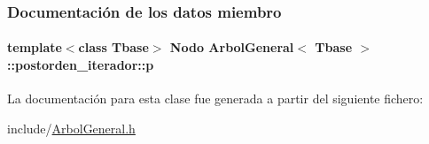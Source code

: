 \subsubsection{Documentación de los datos miembro}
\hypertarget{classArbolGeneral_1_1postorden__iterador_ae269432023776674c7633eadeb8c30e0}{
\paragraph[{p}]{\setlength{\rightskip}{0pt plus 5cm}template$<$class Tbase$>$ {\bf Nodo} {\bf Arbol\-General}$<$ Tbase $>$\-::postorden\-\_\-iterador\-::p\hspace{0.3cm}{\ttfamily [private]}}}\label{classArbolGeneral_1_1postorden__iterador_ae269432023776674c7633eadeb8c30e0}


La documentación para esta clase fue generada a partir del siguiente fichero\-:\begin{DoxyCompactItemize}
\item 
include/\hyperlink{ArbolGeneral_8h}{Arbol\-General.\-h}\end{DoxyCompactItemize}
